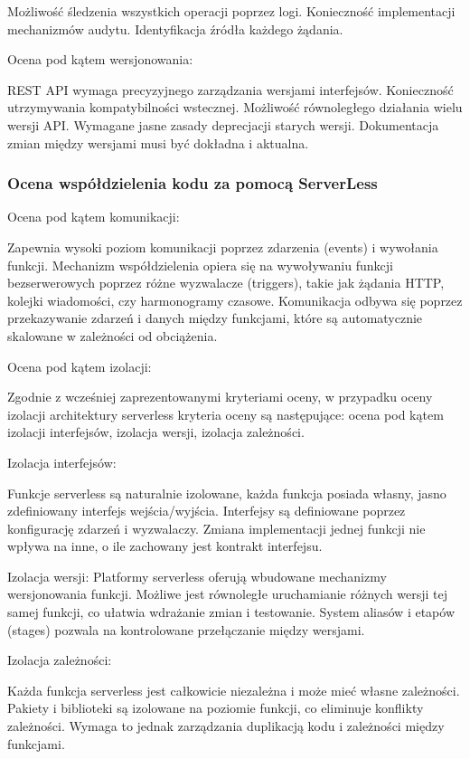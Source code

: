 \documentclass[runningheads,12pt]{llncs}
\begin{document}
Możliwość śledzenia wszystkich operacji poprzez logi. Konieczność implementacji mechanizmów audytu. Identyfikacja źródła każdego żądania. ~\cite[p. 312]{newman2015building}

Ocena pod kątem wersjonowania:

REST API wymaga precyzyjnego zarządzania wersjami interfejsów. Konieczność utrzymywania kompatybilności wstecznej. Możliwość równoległego działania wielu wersji API. Wymagane jasne zasady deprecjacji starych wersji. Dokumentacja zmian między wersjami musi być dokładna i aktualna. ~\cite[p. 134]{richardson2013rest}
\subsubsection{Ocena współdzielenia kodu za pomocą ServerLess}

Ocena pod kątem komunikacji: 

Zapewnia wysoki poziom komunikacji poprzez zdarzenia (events) i wywołania funkcji. Mechanizm współdzielenia opiera się na wywoływaniu funkcji bezserwerowych poprzez różne wyzwalacze (triggers), takie jak żądania HTTP, kolejki wiadomości, czy harmonogramy czasowe. Komunikacja odbywa się poprzez przekazywanie zdarzeń i danych między funkcjami, które są automatycznie skalowane w zależności od obciążenia. ~\cite[p. 45]{roberts2018cloud}

Ocena pod kątem izolacji:

Zgodnie z wcześniej zaprezentowanymi kryteriami oceny, w przypadku oceny izolacji architektury serverless kryteria oceny są następujące: ocena pod kątem izolacji interfejsów, izolacja wersji, izolacja zależności.

Izolacja interfejsów: 

Funkcje serverless są naturalnie izolowane, każda funkcja posiada własny, jasno zdefiniowany interfejs wejścia/wyjścia. Interfejsy są definiowane poprzez konfigurację zdarzeń i wyzwalaczy. Zmiana implementacji jednej funkcji nie wpływa na inne, o ile zachowany jest kontrakt interfejsu. ~\cite[p. 78]{roberts2018cloud}

Izolacja wersji: 
Platformy serverless oferują wbudowane mechanizmy wersjonowania funkcji. Możliwe jest równoległe uruchamianie różnych wersji tej samej funkcji, co ułatwia wdrażanie zmian i testowanie. System aliasów i etapów (stages) pozwala na kontrolowane przełączanie między wersjami. ~\cite[p. 112]{roberts2018cloud}

Izolacja zależności: 

Każda funkcja serverless jest całkowicie niezależna i może mieć własne zależności. Pakiety i biblioteki są izolowane na poziomie funkcji, co eliminuje konflikty zależności. Wymaga to jednak zarządzania duplikacją kodu i zależności między funkcjami. ~\cite[p. 156]{roberts2018cloud}
\end{document}
